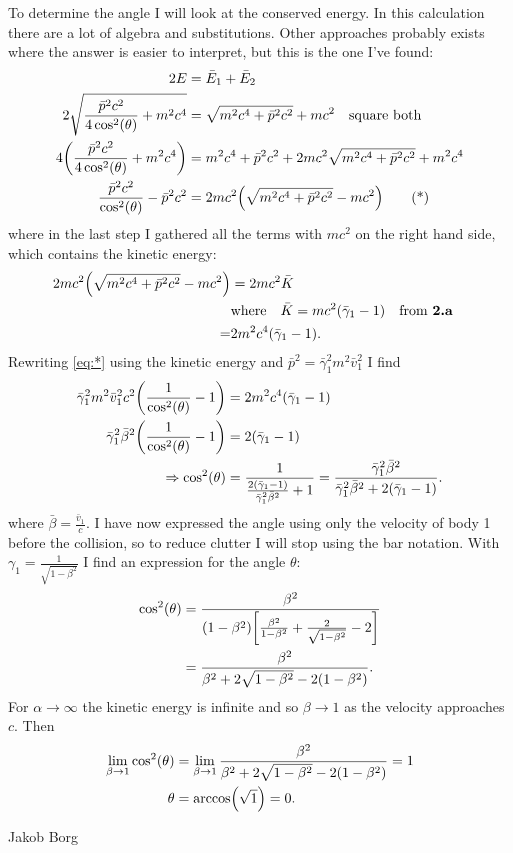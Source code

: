 \documentclass[11pt,a4paper]{report}
\newcounter{excount}[chapter]
\newenvironment{exercise}[1][]{\addtocounter{excount}{1} \noindent {\bf Problem
    \arabic{excount} \ \ #1}\hspace{2mm}}{\vspace{4mm}}
\newenvironment{solution}[1][]
    {\begin{tcolorbox}[title=Solution #1,halign lower=right,breakable]
    }
    {
    \tcblower Jakob Borg
    \end{tcolorbox}
	\vspace{5mm}
    }
\newcommand{\coscost}
{
\cos[2](\theta)
}
\begin{document}
\begin{exercise}
\begin{solution}[\bf 2.e]
To determine the angle I will look at the conserved energy. In this calculation there are a lot of algebra and substitutions. Other approaches probably exists where the answer is easier to interpret, but this is the one I've found:
\begin{align*}
2E&= \bar{E}_1 + \bar{E}_2 
\\
2 \sqrt{\frac{\bar{p}^2c^2}{4\coscost} + m^2c^4} &= \sqrt{m^2c^4+\bar{p}^2c^2}+mc^2 \qq{square both}
\\
4\qty( \frac{\bar{p}^2c^2}{4\coscost} + m^2c^4 ) &= m^2c^4+\bar{p}^2c^2 + 2mc^2\sqrt{m^2c^4+\bar{p}^2c^2} + m^2c^4
\\
\frac{\bar{p}^2c^2}{\coscost} - \bar{p}^2c^2&= 2mc^2 \qty(\sqrt{m^2c^4+\bar{p}^2c^2} - mc^2) \tag{*} \label{eq:*}
\end{align*}
where in the last step I gathered all the terms with $mc^2$ on the right hand side, which contains the kinetic energy:
\begin{align*}
2mc^2 \qty(\sqrt{m^2c^4+\bar{p}^2c^2} - mc^2) &= 2mc^2\bar{K}
\\
&\qq*{where} \bar{K} = mc^2\qty(\bar{\gamma}_1-1) \qq{from \textbf{2.a}}
\\
=& 2 m^2c^4\qty(\bar{\gamma}_1-1).
\end{align*}
Rewriting \cref{eq:*} using the kinetic energy and $\bar{p}^2=\bar{\gamma}_1^2m^2\bar{v}_1^2$ I find
\begin{align*}
\bar{\gamma}_1^2m^2\bar{v}_1^2c^2\qty(\frac{1}{\coscost} - 1)&= 2 m^2c^4\qty(\bar{\gamma}_1-1)
\\
\bar{\gamma}_1^2\bar{\beta}^2\qty(\frac{1}{\coscost} - 1) &= 2\qty(\bar{\gamma}_1-1)
\\
\Rightarrow \coscost &= \frac{1}{\frac{2\qty(\bar{\gamma}_1-1)}{\bar{\gamma}_1^2\bar{\beta}^2}+1} = \frac{\bar{\gamma}_1^2\bar{\beta}^2}{\bar{\gamma}_1^2\bar{\beta}^2 +2\qty(\bar{\gamma}_1-1) }.
\end{align*}
where $\bar{\beta} = \frac{\bar{v}_1}{c}$. I have now expressed the angle using only the velocity of body 1 before the collision, so to reduce clutter I will stop using the bar notation. With $\gamma_1 = \frac{1}{\sqrt{1-\beta^2}}$ I find an expression for the angle $\theta$:
\begin{align*}
\coscost &= \frac{\beta^2}{\qty(1-\beta^2)\qty[\frac{\beta^2}{1-\beta^2}+\frac{2}{\sqrt{1-\beta^2}}-2]}
\\
&= \frac{\beta^2}{\beta^2 + 2\sqrt{1-\beta^2}-2\qty(1-\beta^2)}.
\end{align*}
For $\alpha \rightarrow \infty$ the kinetic energy is infinite and so $\beta \rightarrow 1$ as the velocity approaches $c$. Then
\begin{align*}
\lim_{\beta\rightarrow 1} \coscost &= \lim_{\beta\rightarrow 1}  \frac{\beta^2}{\beta^2 + 2\sqrt{1-\beta^2}-2\qty(1-\beta^2)} = 1
\\
\theta &= \arccos(\sqrt{1}) = 0.
\end{align*}


\end{solution}
\end{exercise}
\end{document}
